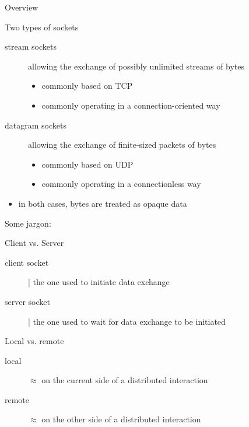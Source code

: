 \documentclass{beamer}\mode<presentation>{\usetheme{AMSBolognaFC}}
\begin{document}
\begin{frame}[c, allowframebreaks]{Overview}
\begin{description}
    \end{description}

    \framebreak

    \begin{block}{Two types of sockets}
        \begin{description}
            \item[stream sockets] allowing the exchange of \alert{possibly unlimited streams} of bytes
            \begin{itemize}\small
                \item commonly based on TCP
                \item commonly operating in a \alert{connection-oriented} way
            \end{itemize}

            \item[datagram sockets] allowing the exchange of \alert{finite-sized packets} of bytes
            \begin{itemize}\small
                \item commonly based on UDP
                \item commonly operating in a \alert{connectionless} way
            \end{itemize}
        \end{description}

        \smallskip

        \begin{itemize}
            \item in both cases, bytes are treated as \alert{opaque data}
        \end{itemize}
    \end{block}

    \framebreak

    Some jargon:

    \bigskip

    \begin{block}{Client vs. Server}
        \begin{description}
            \item[client socket] | the one used to \alert{initiate} data exchange
            \item[server socket] | the one used to \alert{wait} for data exchange to be initiated
        \end{description}
    \end{block}

    \bigskip

    \begin{block}{Local vs. remote}
        \begin{description}
            \item[local] $\approx$ on the \alert{current} side of a distributed interaction
            \item[remote] $\approx$ on the \alert{other} side of a distributed interaction
        \end{description}
    \end{block}
\end{frame}
\end{document}
